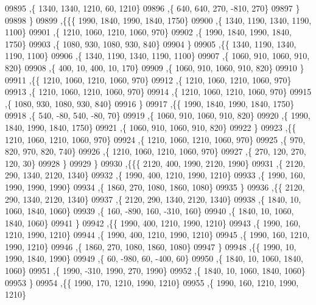 \begin{DoxyCode}
09895     ,\{  1340,  1340,  1210,    60,  1210\}
09896     ,\{   640,   640,   270,  -810,   270\}
09897     \}
09898    \}
09899   ,\{\{\{  1990,  1840,  1990,  1840,  1750\}
09900     ,\{  1340,  1190,  1340,  1190,  1100\}
09901     ,\{  1210,  1060,  1210,  1060,   970\}
09902     ,\{  1990,  1840,  1990,  1840,  1750\}
09903     ,\{  1080,   930,  1080,   930,   840\}
09904     \}
09905    ,\{\{  1340,  1190,  1340,  1190,  1100\}
09906     ,\{  1340,  1190,  1340,  1190,  1100\}
09907     ,\{  1060,   910,  1060,   910,   820\}
09908     ,\{   400,    10,   400,    10,   170\}
09909     ,\{  1060,   910,  1060,   910,   820\}
09910     \}
09911    ,\{\{  1210,  1060,  1210,  1060,   970\}
09912     ,\{  1210,  1060,  1210,  1060,   970\}
09913     ,\{  1210,  1060,  1210,  1060,   970\}
09914     ,\{  1210,  1060,  1210,  1060,   970\}
09915     ,\{  1080,   930,  1080,   930,   840\}
09916     \}
09917    ,\{\{  1990,  1840,  1990,  1840,  1750\}
09918     ,\{   540,   -80,   540,   -80,    70\}
09919     ,\{  1060,   910,  1060,   910,   820\}
09920     ,\{  1990,  1840,  1990,  1840,  1750\}
09921     ,\{  1060,   910,  1060,   910,   820\}
09922     \}
09923    ,\{\{  1210,  1060,  1210,  1060,   970\}
09924     ,\{  1210,  1060,  1210,  1060,   970\}
09925     ,\{   970,   820,   970,   820,   740\}
09926     ,\{  1210,  1060,  1210,  1060,   970\}
09927     ,\{   270,   120,   270,   120,    30\}
09928     \}
09929    \}
09930   ,\{\{\{  2120,   400,  1990,  2120,  1990\}
09931     ,\{  2120,   290,  1340,  2120,  1340\}
09932     ,\{  1990,   400,  1210,  1990,  1210\}
09933     ,\{  1990,   160,  1990,  1990,  1990\}
09934     ,\{  1860,   270,  1080,  1860,  1080\}
09935     \}
09936    ,\{\{  2120,   290,  1340,  2120,  1340\}
09937     ,\{  2120,   290,  1340,  2120,  1340\}
09938     ,\{  1840,    10,  1060,  1840,  1060\}
09939     ,\{   160,  -890,   160,  -310,   160\}
09940     ,\{  1840,    10,  1060,  1840,  1060\}
09941     \}
09942    ,\{\{  1990,   400,  1210,  1990,  1210\}
09943     ,\{  1990,   160,  1210,  1990,  1210\}
09944     ,\{  1990,   400,  1210,  1990,  1210\}
09945     ,\{  1990,   160,  1210,  1990,  1210\}
09946     ,\{  1860,   270,  1080,  1860,  1080\}
09947     \}
09948    ,\{\{  1990,    10,  1990,  1840,  1990\}
09949     ,\{    60,  -980,    60,  -400,    60\}
09950     ,\{  1840,    10,  1060,  1840,  1060\}
09951     ,\{  1990,  -310,  1990,   270,  1990\}
09952     ,\{  1840,    10,  1060,  1840,  1060\}
09953     \}
09954    ,\{\{  1990,   170,  1210,  1990,  1210\}
09955     ,\{  1990,   160,  1210,  1990,  1210\}

\end{DoxyCode}
